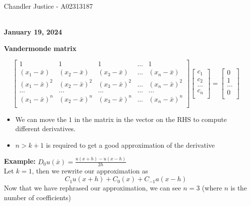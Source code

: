 \documentclass[10pt]{article}
\newcommand{\ds}{\displaystyle}
\begin{document}
\begin{flushright}
Chandler Justice - A02313187
\end{flushright}
\noindent \underline{\hspace{3in}}\\

\textbf{January 19, 2024}\\

\begin{center}
        \textbf{Vandermonde matrix}
\end{center}
\[\begin{bmatrix}
    1 & 1 & 1 & ... & 1\\
    (x_1 - \bar{x}) & (x_2 - \bar{x}) & (x_3 - \bar{x}) & ... & (x_n - \bar{x})\\
    (x_1 - \bar{x})^2 & (x_2 - \bar{x})^2 & (x_3 - \bar{x})^2 & ... & (x_n - \bar{x})^2\\
    ... & ... & ... & ... & ...\\
    (x_1 - \bar{x})^n & (x_2 - \bar{x})^n & (x_3 - \bar{x})^n & ... & (x_n - \bar{x})^n\\
\end{bmatrix}
\begin{bmatrix}
c_1\\
c_2\\
...\\
c_n\\
\end{bmatrix}
=
\begin{bmatrix}
0\\
1\\
...\\
0\\
\end{bmatrix}\]
\begin{itemize}
    \item We can move the $1$ in the matrix in the vector on the RHS to compute different derivatives.
    \item $n > k+1$ is required to get a good approximation of the derivative
\end{itemize}


\textbf{Example:} $\ds D_0 u(\bar{x}) = \frac{u(x + h) - u(x-h)}{2h}$\\

Let $k = 1$, then we rewrite our approximation as
\[C_1 u(x + h) + C_0 (x) + C_{-1}a(x-h)\]
Now that we have rephrased our approximation, we can see $n = 3$ (where $n$ is the number of coefficients)\\
\end{document}
